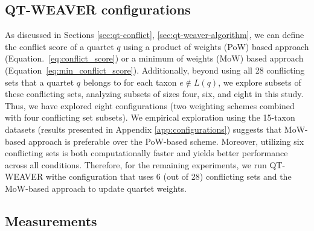 \documentclass[10pt,a4paper]{article}
\begin{document}
 

 
\subsection{QT-WEAVER configurations}

As discussed in Sections \ref{sec:qt-conflict}, \ref{sec:qt-weaver-algorithm}, we can define the conflict score of a quartet $q$ using a product of weights (PoW) based approach (Equation.~\ref{eq:conflict_score}) or a minimum of weights (MoW) based approach (Equation~\ref{eq:min_conflict_score}). %
Additionally, beyond using all 28 conflicting sets that a quartet $q$ belongs to for each taxon $e \notin L(q)$, we explore subsets of these conflicting sets, analyzing subsets of sizes four, six, and eight in this study. Thus, we have explored eight configurations (two weighting schemes combined with four conflicting set subsets). We empirical exploration using the 15-taxon datasets (results presented in Appendix \ref{app:configurations}) suggests that MoW-based approach is preferable over the PoW-based scheme. Moreover, utilizing six conflicting sets is both computationally faster and yields better performance across all conditions. Therefore, for the remaining experiments, we run QT-WEAVER withe configuration that uses 6 (out of 28) conflicting sets and the MoW-based approach to update quartet weights.

\subsection{Measurements}
\end{document}
